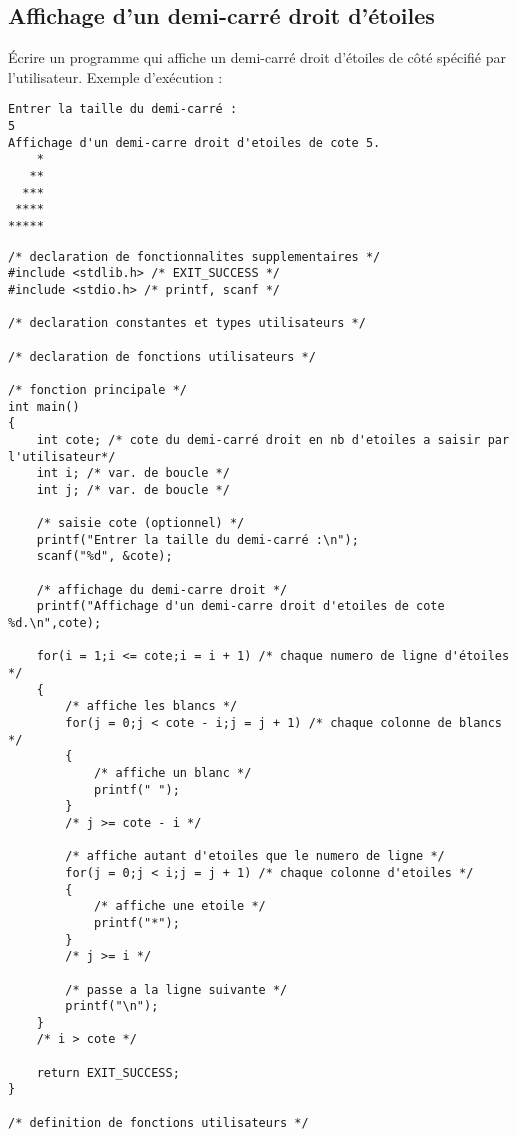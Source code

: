 \subsection{Affichage d'un demi-carré droit d'étoiles}


Écrire un programme  qui affiche un demi-carré droit d'étoiles de côté spécifié par l'utilisateur. Exemple d'exécution :
\begin{small}
\begin{verbatim}
Entrer la taille du demi-carré :
5
Affichage d'un demi-carre droit d'etoiles de cote 5.
    *
   **
  ***
 ****
*****
\end{verbatim}
\end{small}

\begin{correction}
\begin{verbatim}
/* declaration de fonctionnalites supplementaires */
#include <stdlib.h> /* EXIT_SUCCESS */
#include <stdio.h> /* printf, scanf */

/* declaration constantes et types utilisateurs */

/* declaration de fonctions utilisateurs */

/* fonction principale */
int main()
{
    int cote; /* cote du demi-carré droit en nb d'etoiles a saisir par l'utilisateur*/
    int i; /* var. de boucle */
    int j; /* var. de boucle */

    /* saisie cote (optionnel) */
    printf("Entrer la taille du demi-carré :\n");
    scanf("%d", &cote);

    /* affichage du demi-carre droit */
    printf("Affichage d'un demi-carre droit d'etoiles de cote %d.\n",cote);

    for(i = 1;i <= cote;i = i + 1) /* chaque numero de ligne d'étoiles */
    {
        /* affiche les blancs */
        for(j = 0;j < cote - i;j = j + 1) /* chaque colonne de blancs */
        {
            /* affiche un blanc */
            printf(" ");
        }
        /* j >= cote - i */

        /* affiche autant d'etoiles que le numero de ligne */
        for(j = 0;j < i;j = j + 1) /* chaque colonne d'etoiles */
        {
            /* affiche une etoile */
            printf("*");
        }
        /* j >= i */

        /* passe a la ligne suivante */
        printf("\n");
    }
    /* i > cote */

    return EXIT_SUCCESS;
}

/* definition de fonctions utilisateurs */

\end{verbatim}
\end{correction}

